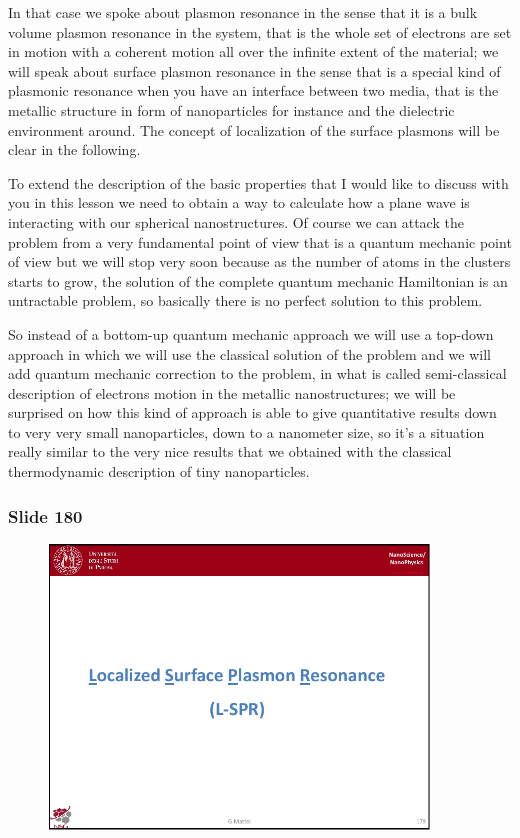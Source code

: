 \documentclass[../main/main.tex]{subfiles}
\begin{document}
In that case we spoke about plasmon resonance in the sense that it is a bulk volume plasmon resonance in the system, that is the whole set of electrons are set in motion with a coherent motion all over the infinite extent of the material;  we will speak about surface plasmon resonance in the sense that is a special kind of plasmonic resonance when you have an interface between two media, that is the metallic structure in form of nanoparticles for instance and the dielectric environment around. The concept of localization of the surface plasmons will be clear in the following.

To extend the description of the basic properties that I would like to discuss with you in this lesson we need to obtain a way to calculate how a plane wave is interacting with our spherical nanostructures. Of course we can attack the problem from a very fundamental point of view that is a quantum mechanic point of view but we will stop very soon because as the number of atoms in the clusters starts to grow, the solution of the complete quantum mechanic Hamiltonian is an untractable problem, so basically there is no perfect solution to this problem.

So instead of a bottom-up quantum mechanic approach we will use a top-down approach in which we will use the classical solution of the problem and we will add quantum mechanic correction to the problem, in what is called semi-classical description of electrons motion in the metallic nanostructures; we will be surprised on how this kind of approach is able to give quantitative results down to very very small nanoparticles, down to a nanometer size, so it's a situation really  similar to the very nice results that we obtained with the classical thermodynamic description of tiny nanoparticles.

\newpage

\subsubsection{Slide 180}

\begin{figure}[h!]
\centering
\includegraphics[page=2,width=0.9\textwidth]{../lessons/pdf_file/11_lesson.pdf}
\end{figure}
\end{document}
